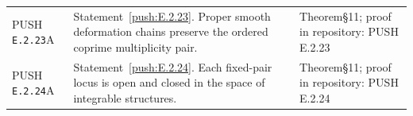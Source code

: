 \documentclass[11pt,a4paper]{article}
\theoremstyle{plain}
\theoremstyle{definition}
\begin{document}
\begin{longtable}{@{}L{.18\linewidth}L{.48\linewidth}L{.29\linewidth}@{}}
PUSH \nolinkurl{E.2.23}\newline A & Statement~\ref{push:E.2.23}. Proper smooth deformation chains preserve the ordered coprime multiplicity pair.\newline {} & Theorem\newline §11; proof in repository:\allowbreak{} PUSH E.2.23\\
PUSH \nolinkurl{E.2.24}\newline A & Statement~\ref{push:E.2.24}. Each fixed-pair locus is open and closed in the space of integrable structures.\newline {} & Theorem\newline §11; proof in repository:\allowbreak{} PUSH E.2.24\\
\bottomrule\end{longtable}\endgroup
\end{document}
